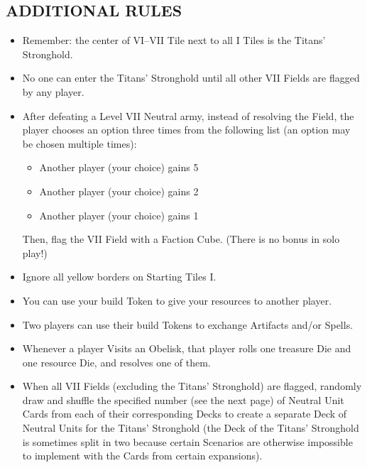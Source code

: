 \begin{multicols*}{2}
\vspace*{\fill}\columnbreak

\subsection*{\MakeUppercase{Additional Rules}}
\begin{itemize}
  \item Remember: the center of VI--VII Tile next to all I Tiles is the Titans' Stronghold.
  \item No one can enter the Titans' Stronghold until all other VII Fields are flagged by any player.

  \item After defeating a Level VII Neutral army, instead of resolving the Field, the player chooses an option three times from the following list (an option may be chosen multiple times):
    \begin{itemize}
      \item Another player (your choice) gains 5\,
      \item Another player (your choice) gains 2\,
      \item Another player (your choice) gains 1\,
    \end{itemize}
  Then, flag the VII Field with a Faction Cube.
  (There is no bonus in solo play!)

  \item Ignore all yellow borders on Starting Tiles I.
  \item You can use your build Token to give your resources to another player.
  \item Two players can use their build Tokens to exchange Artifacts and/or Spells.

  \item Whenever a player Visits an Obelisk, that player rolls one treasure Die and one resource Die, and resolves one of them.
  \item When all VII Fields (excluding the Titans' Stronghold) are flagged, randomly draw and shuffle the specified number (see the next page) of Neutral Unit Cards from each of their corresponding Decks to create a separate Deck of Neutral Units for the Titans' Stronghold (the Deck of the Titans' Stronghold is sometimes split in two because certain Scenarios are otherwise impossible to implement with the Cards from certain expansions).


\end{itemize}
\end{multicols*}
